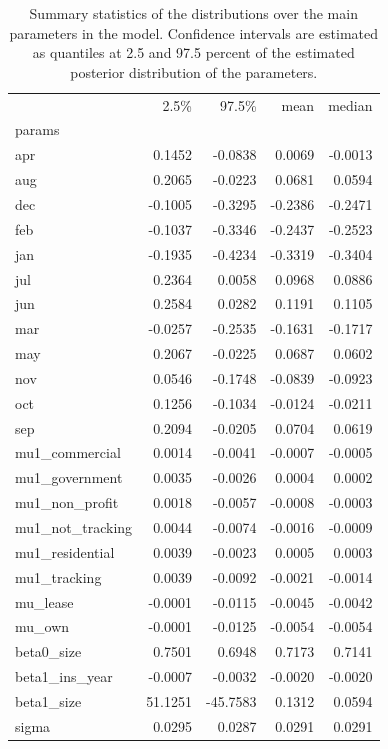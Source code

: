 \documentclass[12pt]{article}
\begin{document}
\begin{table}
\resizebox{12cm}{!} {
\begin{tabular}{lrrrr}
\toprule
{} &  2.5\%&   97.5\% &   mean &  median \\
params           &          &          &         &          \\
\midrule
apr              &   0.1452 &  -0.0838 &  0.0069 &  -0.0013 \\
aug              &   0.2065 &  -0.0223 &  0.0681 &   0.0594 \\
dec              &  -0.1005 &  -0.3295 & -0.2386 &  -0.2471 \\
feb              &  -0.1037 &  -0.3346 & -0.2437 &  -0.2523 \\
jan              &  -0.1935 &  -0.4234 & -0.3319 &  -0.3404 \\
jul              &   0.2364 &   0.0058 &  0.0968 &   0.0886 \\
jun              &   0.2584 &   0.0282 &  0.1191 &   0.1105 \\
mar              &  -0.0257 &  -0.2535 & -0.1631 &  -0.1717 \\
may              &   0.2067 &  -0.0225 &  0.0687 &   0.0602 \\
nov              &   0.0546 &  -0.1748 & -0.0839 &  -0.0923 \\
oct              &   0.1256 &  -0.1034 & -0.0124 &  -0.0211 \\
sep              &   0.2094 &  -0.0205 &  0.0704 &   0.0619 \\
mu1\_commercial   &   0.0014 &  -0.0041 & -0.0007 &  -0.0005 \\
mu1\_government   &   0.0035 &  -0.0026 &  0.0004 &   0.0002 \\
mu1\_non\_profit   &   0.0018 &  -0.0057 & -0.0008 &  -0.0003 \\
mu1\_not\_tracking &   0.0044 &  -0.0074 & -0.0016 &  -0.0009 \\
mu1\_residential  &   0.0039 &  -0.0023 &  0.0005 &   0.0003 \\
mu1\_tracking     &   0.0039 &  -0.0092 & -0.0021 &  -0.0014 \\
mu\_lease         &  -0.0001 &  -0.0115 & -0.0045 &  -0.0042 \\
mu\_own           &  -0.0001 &  -0.0125 & -0.0054 &  -0.0054 \\
beta0\_size       &   0.7501 &   0.6948 &  0.7173 &   0.7141 \\
beta1\_ins\_year   &  -0.0007 &  -0.0032 & -0.0020 &  -0.0020 \\
beta1\_size       &  51.1251 & -45.7583 &  0.1312 &   0.0594 \\
sigma            &   0.0295 &   0.0287 &  0.0291 &   0.0291 \\
\bottomrule
\end{tabular}
}
\label{table_results}
\caption{Summary statistics of the distributions over the main parameters in the model. Confidence intervals are estimated as quantiles at 2.5 and 97.5 percent of the estimated posterior distribution of the parameters.}
\end{table}
\end{document}
